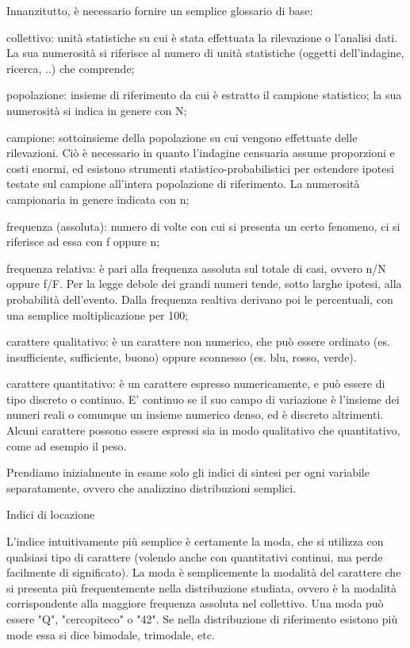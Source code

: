 \documentclass{book}
\begin{document}
Innanzitutto, \`{e} necessario fornire un semplice glossario di base:
\begin{list}{*}{}
\item collettivo: unit\`{a} statistiche su cui \`{e} stata effettuata la rilevazione o l'analisi dati. La sua numerosit\`{a} si riferisce al numero di unit\`{a} statistiche (oggetti dell'indagine, ricerca, ..) che comprende;
\item popolazione: insieme di riferimento da cui \`{e} estratto il campione statistico; la sua numerosit\`{a} si indica in genere con N;
\item campione: sottoinsieme della popolazione su cui vengono effettuate delle rilevazioni. Ciò \`{e} necessario in quanto l'indagine censuaria assume proporzioni e costi enormi, ed esistono strumenti statistico-probabilistici per estendere ipotesi testate sul campione all'intera popolazione di riferimento. La numerosit\`{a} campionaria in genere indicata con n;
\item frequenza (assoluta): numero di volte con cui si presenta un certo fenomeno, ci si riferisce ad essa con f oppure n;
\item frequenza relativa: \`{e} pari alla frequenza assoluta sul totale di casi, ovvero n/N oppure f/F. Per la legge debole dei grandi numeri tende, sotto larghe ipotesi, alla probabilit\`{a} dell'evento. Dalla frequenza realtiva derivano poi le percentuali, con una semplice moltiplicazione per 100;
\item carattere qualitativo: \`{e} un carattere non numerico, che può essere ordinato (es. insufficiente, sufficiente, buono) oppure sconnesso (es. blu, rosso, verde).
\item carattere quantitativo: \`{e} un carattere espresso numericamente, e può essere di tipo discreto o continuo. E' continuo se il suo campo di variazione \`{e} l'insieme dei numeri reali o comunque un insieme numerico denso, ed \`{e} discreto altrimenti. Alcuni carattere possono essere espressi sia in modo qualitativo che quantitativo, come ad esempio il peso.
\end{list}

Prendiamo inizialmente in esame solo gli indici di sintesi per ogni variabile separatamente, ovvero che analizzino distribuzioni semplici.

Indici di locazione

L'indice intuitivamente più semplice \`{e} certamente la moda, che si utilizza con qualsiasi tipo di carattere (volendo anche con quantitativi continui, ma perde facilmente di significato).
La moda \`{e} semplicemente la modalit\`{a} del carattere che si presenta più frequentemente nella distribuzione studiata, ovvero \`{e} la modalit\`{a} corrispondente alla maggiore frequenza assoluta nel collettivo.
Una moda può essere "Q", "cercopiteco" o "42". Se nella distribuzione di riferimento esistono più mode essa si dice bimodale, trimodale, etc.
\end{document}
